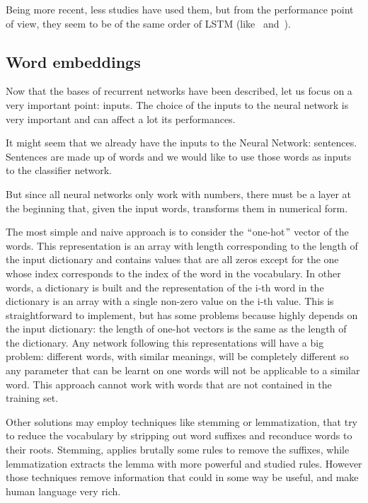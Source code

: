 Being more recent, less studies have used them, but from the performance point of view, they seem to be of the same order of LSTM (like~\cite{jozefowicz2015empirical} and~\cite{chung2014empirical}).

\subsection{Word embeddings}
\label{soaWordEmbeddings}

Now that the bases of recurrent networks have been described, let us focus on a very important point: inputs. The choice of the inputs to the neural network is very important and can affect a lot its performances.

It might seem that we already have the inputs to the Neural Network: sentences. Sentences are made up of words and we would like to use those words as inputs to the classifier network.

But since all neural networks only work with numbers, there must be a layer at the beginning that, given the input words, transforms them in numerical form.

The most simple and naive approach is to consider the $``$one-hot$"$  vector of the words. This representation is an array with length corresponding to the length of the input dictionary and contains values that are all zeros except for the one whose index corresponds to the index of the word in the vocabulary. In other words, a dictionary is built and the representation of the i-th word in the dictionary is an array with a single non-zero value on the i-th value. This is straightforward to implement, but has some problems because highly depends on the input dictionary: the length of one-hot vectors is the same as the length of the dictionary. Any network following this representations will have a big problem: different words, with similar meanings, will be completely different so any parameter that can be learnt on one words will not be applicable to a similar word. This approach cannot work with words that are not contained in the training set.

Other solutions may employ techniques like stemming or lemmatization, that try to reduce the vocabulary by stripping out word suffixes and reconduce words to their roots. Stemming, applies brutally some rules to remove the suffixes, while lemmatization extracts the lemma with more powerful and studied rules. However those techniques remove information that could in some way be useful, and make human language very rich.

